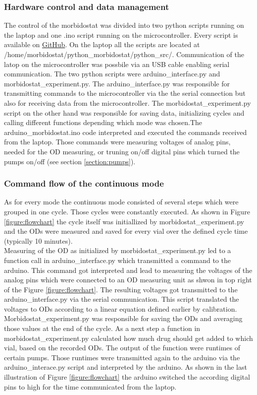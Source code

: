 \subsubsection{Hardware control and data management}
The control of the morbidostat was divided into two python scripts running on the laptop and one .ino script running on the microcontroller. Every script is available on \href{https://github.com/nahanoo/ESBL\_project/}{GitHub}. On the laptop all the scripts are located at \newline /home/morbidostat/python\_morbidostat/python\_src/.
Communication of the latop on the microcontroller was possbile via an USB cable enabling serial communication.
The two python scripts were arduino\_interface.py and morbidostat\_experiment.py. The arduino\_interface.py was responsible for transmitting commands to the microcontroller via the the serial connection but also for receiving data from the microcontroller. The morbidostat\_experiment.py script on the other hand was responsible for saving data, initializing cycles and calling different functions depending which mode was chosen.The arduino\_morbidostat.ino code interpreted and executed the commands received from the laptop. Those commands were measuring voltages of analog pins, needed for the OD measuring, or truning on/off digital pins which turned the pumps on/off (see section \ref{section:pumps}).


\subsubsection{Command flow of the continuous mode} 
As for every mode the continuous mode consisted of several steps which were grouped in one cycle. Those cycles were constantly executed. As shown in Figure \ref{figure:flowchart} the cycle itself was initiallized by morbidostat\_experiment.py and the ODs were measured and saved for every vial over the defined cycle time (typically 10 minutes). \\
Measuring of the OD as initialized by morbidostat\_experiment.py led to a function call in arduino\_interface.py which transmitted a command to the arduino. This command got interpreted and lead to measuring the voltages of the analog pins which were connected to an OD measuring unit as shwon in top right of the Figure \ref{figure:flowchart}. The resulting voltages got transmitted to the arduino\_interface.py via the serial communication. This script translated the voltages to ODs according to a linear equation defined earlier by calibration. Morbidostat\_experiment.py was responsible for saving the ODs and averaging those values at the end of the cycle. As a next step a function in morbidostat\_experiment.py calculated how much drug should get added to which vial, based on the recorded ODs. The output of the function were runtimes of certain pumps. Those runtimes were transmitted again to the arduino via the arduino\_interace.py script and interpreted by the arduino. As shown in the last illustration of Figure \ref{figure:flowchart} the arduino switched the according digital pins to high for the time communicated from the laptop.
 
